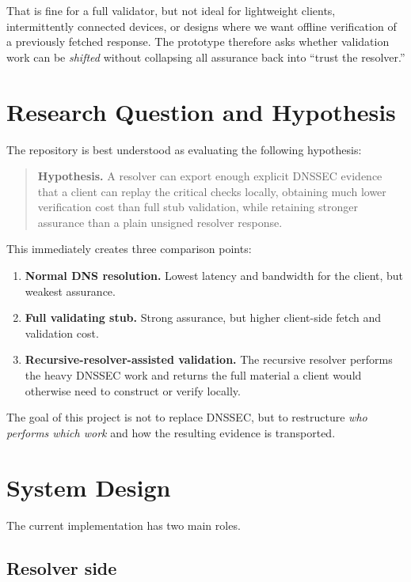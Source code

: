 \documentclass[11pt]{article}
\begin{document}
That is fine for a full validator, but not ideal for lightweight clients, intermittently connected devices, or designs where we want offline verification of a previously fetched response. The prototype therefore asks whether validation work can be \emph{shifted} without collapsing all assurance back into ``trust the resolver.''

\section{Research Question and Hypothesis}

The repository is best understood as evaluating the following hypothesis:

\begin{quote}
\textbf{Hypothesis.} A resolver can export enough explicit DNSSEC evidence that a client can replay the critical checks locally, obtaining much lower verification cost than full stub validation, while retaining stronger assurance than a plain unsigned resolver response.
\end{quote}

This immediately creates three comparison points:

\begin{enumerate}[nosep]
    \item \textbf{Normal DNS resolution.} Lowest latency and bandwidth for the client, but weakest assurance.
    \item \textbf{Full validating stub.} Strong assurance, but higher client-side fetch and validation cost.
    \item \textbf{Recursive-resolver-assisted validation.} The recursive resolver performs the heavy DNSSEC work and returns the full material a client would otherwise need to construct or verify locally.
\end{enumerate}

The goal of this project is not to replace DNSSEC, but to restructure \emph{who performs which work} and how the resulting evidence is transported.

\section{System Design}

The current implementation has two main roles.

\subsection*{Resolver side}
\end{document}
